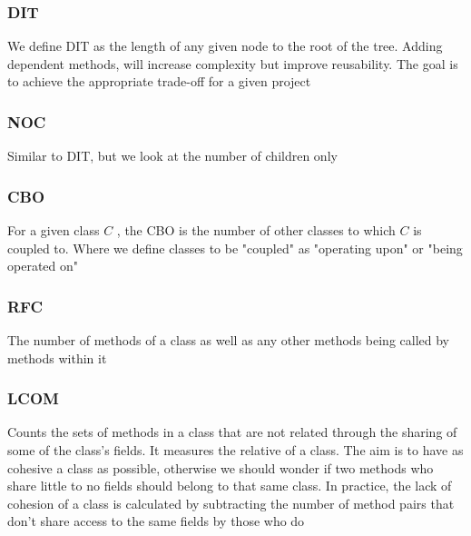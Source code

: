 \subsubsection{DIT}

\par{We define DIT as the length of any given node to the root of the tree.
Adding dependent methods, will increase complexity but improve reusability. The
goal is to achieve the appropriate trade-off for a given project}

\subsubsection{NOC}

\par{Similar to DIT, but we look at the number of  children only}

\subsubsection{CBO}

\par{For a given class $C$ , the CBO is the number of other classes to which $C$
is coupled to. Where we define classes to be "coupled" as "operating upon" or
"being operated on"}

\subsubsection{RFC}

\par{The number of methods of a class as well as any other methods being called
by methods within it}

\subsubsection{LCOM}

\par{Counts the sets of methods in a class that are not related
through the sharing of some of the class's fields. It measures the relative
 of a class. The aim is to have as cohesive a class as
possible, otherwise we should wonder if two methods who share little to no
fields should belong to that same class. In practice, the lack of cohesion of a
class is calculated by subtracting the number of method pairs that don't share
access to the same fields by those who do}

\ex{
\vphantom{\\[2mm]}
	
}
